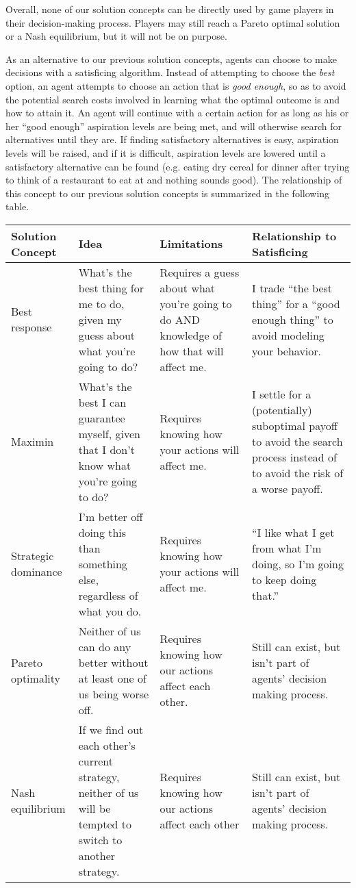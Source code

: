 \documentclass[11pt]{article}
\begin{document}
Overall, none of our solution concepts can be directly used by game players in their decision-making process. Players may still reach a Pareto optimal solution or a Nash equilibrium, but it will not be on purpose.

As an alternative to our previous solution concepts, agents can choose to make decisions with a satisficing algorithm. Instead of attempting to choose the \textit{best} option, an agent attempts to choose an action that is \textit{good enough}, so as to avoid the potential search costs involved in learning what the optimal outcome is and how to attain it. An agent will continue with a certain action for as long as his or her ``good enough'' aspiration levels are being met, and will otherwise search for alternatives until they are. If finding satisfactory alternatives is easy, aspiration levels will be raised, and if it is difficult, aspiration levels are lowered until a satisfactory alternative can be found (e.g. eating dry cereal for dinner after trying to think of a restaurant to eat at and nothing sounds good). The relationship of this concept to our previous solution concepts is summarized in the following table.

\begin{center}
\renewcommand{\arraystretch}{1.2}

\begin{tabulary}{0.9\textwidth}{|p{0.1\textwidth}|L|L|L|}
\hline
Solution Concept & Idea & Limitations & Relationship to Satisficing \\ \hline\hline
Best response & What's the best thing for me to do, given my guess about what you're going to do? & Requires a guess about what you're going to do AND knowledge of how that will affect me. & I trade ``the best thing'' for a ``good enough thing'' to avoid modeling your behavior. \\ \hline
Maximin & What's the best I can guarantee myself, given that I don't know what you're going to do? & Requires knowing how your actions will affect me. & I settle for a (potentially) suboptimal payoff to avoid the search process instead of to avoid the risk of a worse payoff. \\ \hline
Strategic dominance & I'm better off doing this than something else, regardless of what you do. & Requires knowing how your actions will affect me. & ``I like what I get from what I'm doing, so I'm going to keep doing that.'' \\ \hline
Pareto optimality & Neither of us can do any better without at least one of us being worse off. & Requires knowing how our actions affect each other. & Still can exist, but isn't part of agents' decision making process. \\ \hline
Nash equilibrium & If we find out each other's current strategy, neither of us will be tempted to switch to another strategy. & Requires knowing how our actions affect each other & Still can exist, but isn't part of agents' decision making process. \\ \hline

\end{tabulary}
\end{center}
\end{document}

